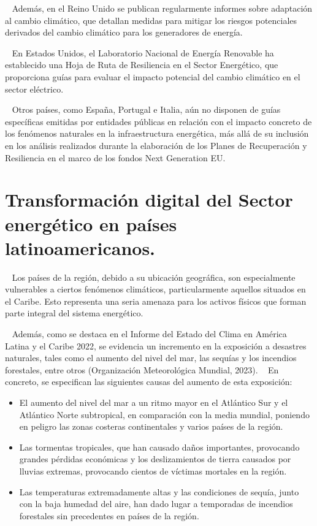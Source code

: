 \documentclass{article}
\begin{document}
~ Además, en el Reino Unido se publican regularmente informes sobre
adaptación al cambio climático, que detallan medidas para mitigar los
riesgos potenciales derivados del cambio climático para los generadores
de energía.

~ En Estados Unidos, el Laboratorio Nacional de Energía Renovable ha
establecido una Hoja de Ruta de Resiliencia en el Sector Energético, que
proporciona guías para evaluar el impacto potencial del cambio climático
en el sector eléctrico.

~ Otros países, como España, Portugal e Italia, aún no disponen de guías
específicas emitidas por entidades públicas en relación con el impacto
concreto de los fenómenos naturales en la infraestructura energética,
más allá de su inclusión en los análisis realizados durante la
elaboración de los Planes de Recuperación y Resiliencia en el marco de
los fondos Next Generation EU.

\hypertarget{transformaciuxf3n-digital-del-sector-energuxe9tico-en-pauxedses-latinoamericanos.}{%
\section{Transformación digital del Sector energético en países
latinoamericanos.}\label{transformaciuxf3n-digital-del-sector-energuxe9tico-en-pauxedses-latinoamericanos.}}

~ Los países de la región, debido a su ubicación geográfica, son
especialmente vulnerables a ciertos fenómenos climáticos,
particularmente aquellos situados en el Caribe. Esto representa una
seria amenaza para los activos físicos que forman parte integral del
sistema energético.

~ Además, como se destaca en el Informe del Estado del Clima en América
Latina y el Caribe 2022, se evidencia un incremento en la exposición a
desastres naturales, tales como el aumento del nivel del mar, las
sequías y los incendios forestales, entre otros (Organización
Meteorológica Mundial, 2023). ~ En concreto, se especifican las
siguientes causas del aumento de esta exposición:

\begin{itemize}
\item
  El aumento del nivel del mar a un ritmo mayor en el Atlántico Sur y el
  Atlántico Norte subtropical, en comparación con la media mundial,
  poniendo en peligro las zonas costeras continentales y varios países
  de la región.
\item
  Las tormentas tropicales, que han causado daños importantes,
  provocando grandes pérdidas económicas y los deslizamientos de tierra
  causados por lluvias extremas, provocando cientos de víctimas mortales
  en la región.
\item
  Las temperaturas extremadamente altas y las condiciones de sequía,
  junto con la baja humedad del aire, han dado lugar a temporadas de
  incendios forestales sin precedentes en países de la región.
\end{itemize}
\end{document}
